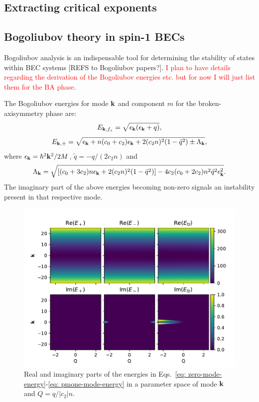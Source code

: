 \subsection{Extracting critical exponents}

\subsection{Bogoliubov theory in spin-1 BECs}
Bogoliubov analysis is an indispensable tool for determining the stability of
states within BEC systems [REFS to Bogoliubov papers?].
\textcolor{red}{I plan to have details regarding the derivation of the
Bogoliubov energies etc. but for now I will just list them for the BA phase.}

The Bogoliubov energies for mode $\vb{k}$ and component $m$ for the
broken-axisymmetry phase are:
\begin{equation}
    E_{\vb{k}, {f_z}} = \sqrt{\epsilon_{\vb{k}}(\epsilon_{\vb{k}} + q)},
    \label{eq: zero-mode-energy}
\end{equation}
\begin{equation}
    E_{\vb{k}, \pm} = \sqrt{\epsilon_{\vb{k}} + n(c_0 + c_2)\epsilon_{\vb{k}} 
    + 2(c_2n)^2(1 - \tilde{q}^2) \pm \Lambda_{\vb{k}}},
    \label{eq: pmone-mode-energy}
\end{equation}
where $\epsilon_{\vb{k}} = \hbar^2\vb{k}^2 / 2M$, $\tilde{q} = -q/(2c_2n)$ and
\begin{equation}
    \Lambda_{\vb{k}} = \sqrt{[(c_0+3c_2)n\epsilon_{\vb{k}} 
    + 2(c_2n)^2(1-\tilde{q}^2)] 
    - 4c_2(c_0+2c_2)n^2\tilde{q}^2\epsilon_{\vb{k}}^2}.
\end{equation}
The imaginary part of the above energies becoming non-zero signals an
instability present in that respective mode.
\begin{figure}[tb]
    \centering
    \includegraphics[width=\textwidth]{gfx/ch-spin1/dens_spin_energies.pdf}
    \caption{Real and imaginary parts of the energies in
    Eqs.~\eqref{eq: zero-mode-energy}-\eqref{eq: pmone-mode-energy} in a
    parameter space of mode $\vb{k}$ and $Q=q/|c_2|n$.}
    \label{fig: dens-spin-energies}
\end{figure}

